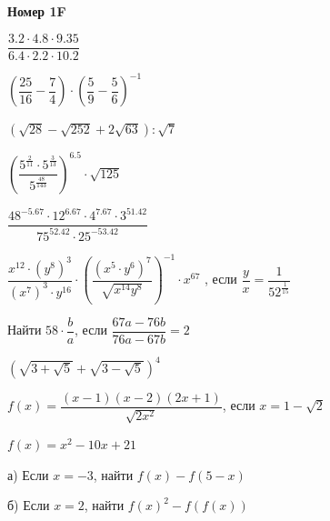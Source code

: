 \centerline{\bf \Huge Номер 1F}

 $\dfrac{3.2\cdot4.8\cdot9.35}{6.4\cdot2.2\cdot10.2}$

\hspace{3mm}

 $\left(\dfrac{25}{16}-\dfrac{7}{4}\right)\cdot\left(\dfrac{5}{9}-\dfrac{5}{6}\right)^{-1}$

\hspace{3mm}

 $(\sqrt{28}-\sqrt{252}+2 \sqrt{63}): \sqrt{7}$

\hspace{3mm}

 $\left(\dfrac{5^{\frac{2}{11}}\cdot5^{\frac{3}{13}}}{5^{\frac{48}{143}}}\right)^{6.5}\cdot\sqrt{125}$

\hspace{3mm}

 $\dfrac{48^{-5.67}\cdot12^{6.67}\cdot4^{7.67}\cdot3^{51.42}}{75^{52.42}\cdot25^{-53.42}}$

\hspace{3mm}

 $\dfrac{x^{12}\cdot\left(y^{8}\right)^{3}}{\left(x^{7}\right)^{3}\cdot y^{16}}\cdot\left(\dfrac{\left(x^{5}\cdot y^{6}\right)^{7}}{\sqrt{x^{14}y^{8}}}\right)^{-1}\cdot x^{67}$ , если $\dfrac{y}{x}=\dfrac{1}{52^{\frac{1}{15}}}$

\hspace{3mm}

 Найти $58\cdot\dfrac{b}{a}$, если $\dfrac{67a-76b}{76a-67b}=2$

\hspace{3mm}

 $(\sqrt{3+\sqrt{5}}+\sqrt{3-\sqrt{5}})^4$

\hspace{3mm}

 $f(x)=\dfrac{(x-1)(x-2)(2 x+1)}{\sqrt{2 x^2}}$, если $x=1-\sqrt{2}$

\hspace{3mm}

 $f(x)=x^2-10x+21$ 

а) Если $x=-3$, найти $f(x)-f(5-x)$

б) Если $x=2$, найти $f(x)^2-f(f(x))$






